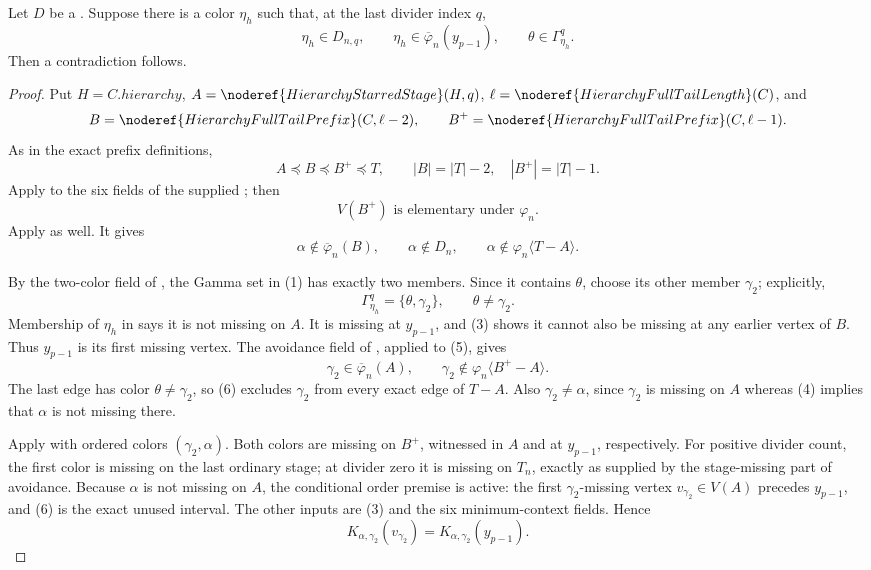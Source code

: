 \begin{lemma}
Let \(D\) be a .  Suppose
there is a color \(\eta_h\) such that, at the last divider index \(q\),
\[
 \eta_h\in D_{n,q},\qquad
 \eta_h\in\overline\varphi_n(y_{p-1}),\qquad
 \theta\in\Gamma^q_{\eta_h}.                               \tag{1}
\]
Then a contradiction follows.
\end{lemma}
\begin{proof}
Put \(H=C.\mathit{hierarchy}\),
\(A=\noderef{HierarchyStarredStage}(H,q)\),
\(\ell=\noderef{HierarchyFullTailLength}(C)\), and
\[
 B=\noderef{HierarchyFullTailPrefix}(C,\ell-2),\qquad
 B^+=\noderef{HierarchyFullTailPrefix}(C,\ell-1).
\]
As in the exact prefix definitions,
\[
 A\preccurlyeq B\preccurlyeq B^+\preccurlyeq T,\qquad
 |B|=|T|-2,\quad |B^+|=|T|-1.                              \tag{2}
\]
Apply  to the six
fields of the supplied ;
then
\[
              V(B^+)\text{ is elementary under }\varphi_n. \tag{3}
\]
Apply  as well.  It gives
\[
 \alpha\notin\overline\varphi_n(B),\qquad
 \alpha\notin D_n,\qquad
 \alpha\notin\varphi_n\langle T-A\rangle.                  \tag{4}
\]

By the two-color field of , the Gamma set in
(1) has exactly two members.  Since it contains \(\theta\), choose its
other member \(\gamma_2\); explicitly,
\[
 \Gamma^q_{\eta_h}=\{\theta,\gamma_2\},\qquad
 \theta\ne\gamma_2.                                       \tag{5}
\]
Membership of \(\eta_h\) in
 says it is not missing on \(A\).
It is missing at \(y_{p-1}\), and (3) shows it cannot also be missing at
any earlier vertex of \(B\).  Thus \(y_{p-1}\) is its first missing
vertex.  The avoidance field of , applied to
(5), gives
\[
 \gamma_2\in\overline\varphi_n(A),\qquad
 \gamma_2\notin\varphi_n\langle B^+-A\rangle.               \tag{6}
\]
The last edge has color \(\theta\ne\gamma_2\), so (6) excludes
\(\gamma_2\) from every exact edge of \(T-A\).  Also
\(\gamma_2\ne\alpha\), since \(\gamma_2\) is missing on \(A\) whereas
(4) implies that \(\alpha\) is not missing there.

Apply  with ordered colors
\((\gamma_2,\alpha)\).  Both colors are missing on \(B^+\), witnessed
in \(A\) and at \(y_{p-1}\), respectively.  For positive divider count,
the first color is missing on the last ordinary stage; at divider zero it
is missing on \(T_n\), exactly as supplied by the stage-missing part of
avoidance.  Because \(\alpha\) is not missing on \(A\), the conditional
order premise is active: the first \(\gamma_2\)-missing vertex
\(v_{\gamma_2}\in V(A)\) precedes \(y_{p-1}\), and (6) is the exact
unused interval.  The other inputs are (3) and the six minimum-context
fields.  Hence
\[
 K_{\alpha,\gamma_2}(v_{\gamma_2})
       =K_{\alpha,\gamma_2}(y_{p-1}).                        \tag{7}
\]


\end{proof}
